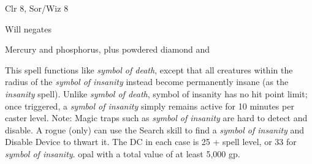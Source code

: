 
\begin{description*}
\item[Level:] Clr 8, Sor/Wiz 8
\item[Saving Throw:] Will negates
\item[Arcane Material Component:] Mercury and phosphorus, plus powdered diamond and
\end{description*}

This spell functions like \textit{symbol of death}, except that all creatures within
the radius of the \textit{symbol of insanity} instead become permanently insane
(as the \textit{insanity} spell).
Unlike \textit{symbol of death}, symbol of insanity has no hit point limit; once
triggered, a \textit{symbol of insanity} simply remains active for 10 minutes per
caster level.
Note: Magic traps such as \textit{symbol of insanity} are hard to detect
and disable. A rogue (only) can use the Search skill to find a \textit{symbol of
insanity} and Disable Device to thwart it. The DC in each case is 25 + spell level,
or 33 for \textit{symbol of insanity}.
opal with a total value of at least 5,000 gp.